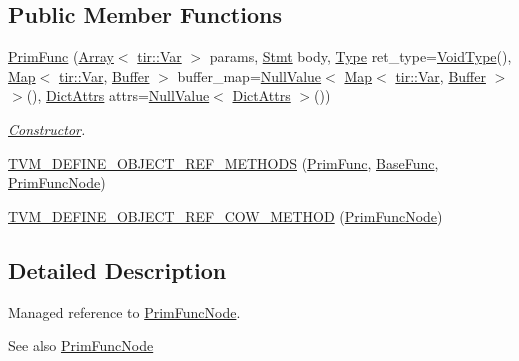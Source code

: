 \subsection*{Public Member Functions}
\begin{DoxyCompactItemize}
\item 
\hyperlink{classtvm_1_1tir_1_1PrimFunc_afc21d76cce465f0c5281abc56cc095fb}{Prim\+Func} (\hyperlink{classtvm_1_1Array}{Array}$<$ \hyperlink{classtvm_1_1tir_1_1Var}{tir\+::\+Var} $>$ params, \hyperlink{classtvm_1_1tir_1_1Stmt}{Stmt} body, \hyperlink{classtvm_1_1Type}{Type} ret\+\_\+type=\hyperlink{namespacetvm_a27df956aaa2e5e25005e0f9dc1638a08}{Void\+Type}(), \hyperlink{classtvm_1_1Map}{Map}$<$ \hyperlink{classtvm_1_1tir_1_1Var}{tir\+::\+Var}, \hyperlink{classtvm_1_1tir_1_1Buffer}{Buffer} $>$ buffer\+\_\+map=\hyperlink{namespacetvm_ab6c242e8ac09beb463fba306948b7f15}{Null\+Value}$<$ \hyperlink{classtvm_1_1Map}{Map}$<$ \hyperlink{classtvm_1_1tir_1_1Var}{tir\+::\+Var}, \hyperlink{classtvm_1_1tir_1_1Buffer}{Buffer} $>$$>$(), \hyperlink{classtvm_1_1DictAttrs}{Dict\+Attrs} attrs=\hyperlink{namespacetvm_ab6c242e8ac09beb463fba306948b7f15}{Null\+Value}$<$ \hyperlink{classtvm_1_1DictAttrs}{Dict\+Attrs} $>$())
\begin{DoxyCompactList}\small\item\em \hyperlink{classtvm_1_1Constructor}{Constructor}. \end{DoxyCompactList}\item 
\hyperlink{classtvm_1_1tir_1_1PrimFunc_aa4043b8cd4776fdbc8e7c3cb705a6f5e}{T\+V\+M\+\_\+\+D\+E\+F\+I\+N\+E\+\_\+\+O\+B\+J\+E\+C\+T\+\_\+\+R\+E\+F\+\_\+\+M\+E\+T\+H\+O\+DS} (\hyperlink{classtvm_1_1tir_1_1PrimFunc}{Prim\+Func}, \hyperlink{classtvm_1_1BaseFunc}{Base\+Func}, \hyperlink{classtvm_1_1tir_1_1PrimFuncNode}{Prim\+Func\+Node})
\item 
\hyperlink{classtvm_1_1tir_1_1PrimFunc_a1670eb2c0453ed14f7caf004df9a42d8}{T\+V\+M\+\_\+\+D\+E\+F\+I\+N\+E\+\_\+\+O\+B\+J\+E\+C\+T\+\_\+\+R\+E\+F\+\_\+\+C\+O\+W\+\_\+\+M\+E\+T\+H\+OD} (\hyperlink{classtvm_1_1tir_1_1PrimFuncNode}{Prim\+Func\+Node})
\end{DoxyCompactItemize}


\subsection{Detailed Description}
Managed reference to \hyperlink{classtvm_1_1tir_1_1PrimFuncNode}{Prim\+Func\+Node}. 

\begin{DoxySeeAlso}{See also}
\hyperlink{classtvm_1_1tir_1_1PrimFuncNode}{Prim\+Func\+Node} 
\end{DoxySeeAlso}


